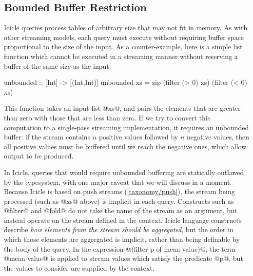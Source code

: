 \subsection{Bounded Buffer Restriction}
\label{icicle:s:IcicleSource:bounded}
Icicle queries process tables of arbitrary size that may not fit in memory.
As with other streaming models, each query must execute without requiring buffer space proportional to the size of the input.
As a counter-example, here is a simple list function which cannot be executed in a streaming manner without reserving a buffer of the same size as the input:
\begin{haskell}
unbounded :: [Int] -> [(Int,Int)]
unbounded xs = zip (filter (> 0) xs) (filter (< 0) xs)
\end{haskell}

This function takes an input list @xs@, and pairs the elements that are greater than zero with those that are less than zero.
If we try to convert this computation to a single-pass streaming implementation, it requires an unbounded buffer: if the stream contains $n$ positive values followed by $n$ negative values, then all positive values must be buffered until we reach the negative ones, which allow output to be produced.


In Icicle, queries that would require unbounded buffering are statically outlawed by the typesystem, with one major caveat that we will discuss in a moment.
Because Icicle is based on push streams (\autoref{taxonomy/push}), the stream being processed (such as @xs@ above) is implicit in each query.
Constructs such as @filter@ and @fold@ do not take the name of the stream as an argument, but instead operate on the stream defined in the context.
Icicle language constructs describe \emph{how elements from the stream should be aggregated}, but the order in which those elements are aggregated is implicit, rather than being definable by the body of the query.
In the expression @(filter p of mean value)@, the term @mean value@ is applied to stream values which satisfy the predicate @p@, but the values to consider are supplied by the context.

